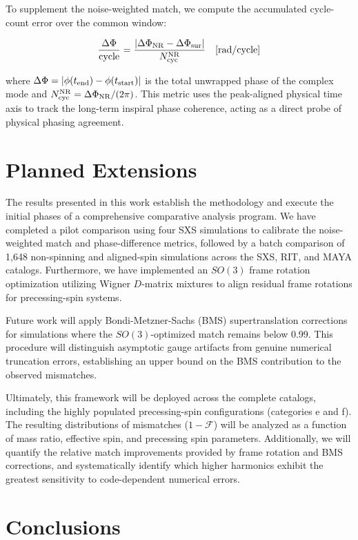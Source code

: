 \documentclass[%
 reprint,
superscriptaddress,
 amsmath,amssymb,
 aps,
]{revtex4-2}
\begin{document}
To supplement the noise-weighted match, we compute the accumulated cycle-count error over the common window:

\begin{equation}\frac{\Delta\Phi}{\rm cycle} = \frac{|\Delta\Phi_{\rm NR} - \Delta\Phi_{\rm sur}|}{N_{\rm cyc}^{\rm NR}}\quad [\mathrm{rad/cycle}]\end{equation}

where $\Delta\Phi = |\phi(t_{\rm end}) - \phi(t_{\rm start})|$ is the total unwrapped phase of the complex mode and $N_{\rm cyc}^{\rm NR} = \Delta\Phi_{\rm NR} / (2\pi)$. This metric uses the peak-aligned physical time axis to track the long-term inspiral phase coherence, acting as a direct probe of physical phasing agreement.


\section{Planned Extensions}

The results presented in this work establish the methodology and execute the initial phases of a comprehensive comparative analysis program. We have completed a pilot comparison using four SXS simulations to calibrate the noise-weighted match and phase-difference metrics, followed by a batch comparison of 1,648 non-spinning and aligned-spin simulations across the SXS, RIT, and MAYA catalogs. Furthermore, we have implemented an $SO(3)$ frame rotation optimization utilizing Wigner $D$-matrix mixtures to align residual frame rotations for precessing-spin systems.

Future work will apply Bondi-Metzner-Sachs (BMS) supertranslation corrections for simulations where the $SO(3)$-optimized match remains below 0.99. This procedure will distinguish asymptotic gauge artifacts from genuine numerical truncation errors, establishing an upper bound on the BMS contribution to the observed mismatches.

Ultimately, this framework will be deployed across the complete catalogs, including the highly populated precessing-spin configurations (categories e and f). The resulting distributions of mismatches ($1 - \mathcal{F}$) will be analyzed as a function of mass ratio, effective spin, and precessing spin parameters. Additionally, we will quantify the relative match improvements provided by frame rotation and BMS corrections, and systematically identify which higher harmonics exhibit the greatest sensitivity to code-dependent numerical errors.


\section{Conclusions}
\end{document}
